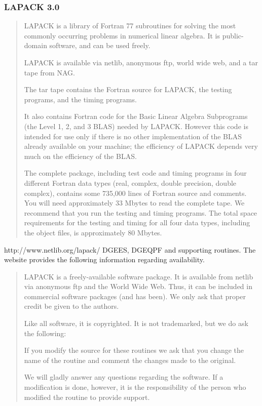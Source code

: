 \documentclass[12pt]{article}
\begin{document}
\subsubsection{ LAPACK 3.0}


\label{sec:lapack}


\begin{quote}
  
LAPACK is a library of Fortran 77 subroutines for solving
the most commonly occurring problems in numerical linear algebra.
It is public-domain software, and can be used freely.

LAPACK is available via netlib, anonymous ftp, world wide web, and a
tar tape from NAG.

The tar tape contains the Fortran source for LAPACK, the testing programs, and
the timing programs.

It also contains Fortran code for the Basic Linear Algebra Subprograms
(the Level 1, 2, and 3 BLAS) needed by LAPACK.
However this code is intended for use only if there is no other implementation
of the BLAS already available on your machine; the efficiency of LAPACK
depends very much on the efficiency of the BLAS.

The complete package, including test code and timing programs in four
different Fortran data types (real, complex, double precision, double
complex), contains some 735,000 lines of Fortran source and comments.
You will need approximately 33 Mbytes to read the complete tape.
We recommend that you run the testing and timing programs.
The total space requirements for the testing and timing for all four data
types, including the object files, is approximately 80 Mbytes.
\end{quote}



 http://www.netlib.org/lapack/
DGEES, DGEQPF and supporting routines. The website provides the following information
regarding availability.
\begin{quote}


LAPACK is a freely-available software package. 
It is available from netlib via anonymous ftp and the World Wide Web. 
Thus, it can be included in
commercial software packages (and has been). 
We only ask that proper credit be given to the authors.

Like all software, it is copyrighted. 
It is not trademarked, but we do ask the following:

If you modify the source for these routines we ask that 
you change the name of the routine and comment the changes 
made to the original.

We will gladly answer any questions regarding the software. 
If a modification is done, however, 
it is the responsibility of the person who modified the
routine to provide support.
\end{quote}
\end{document}
